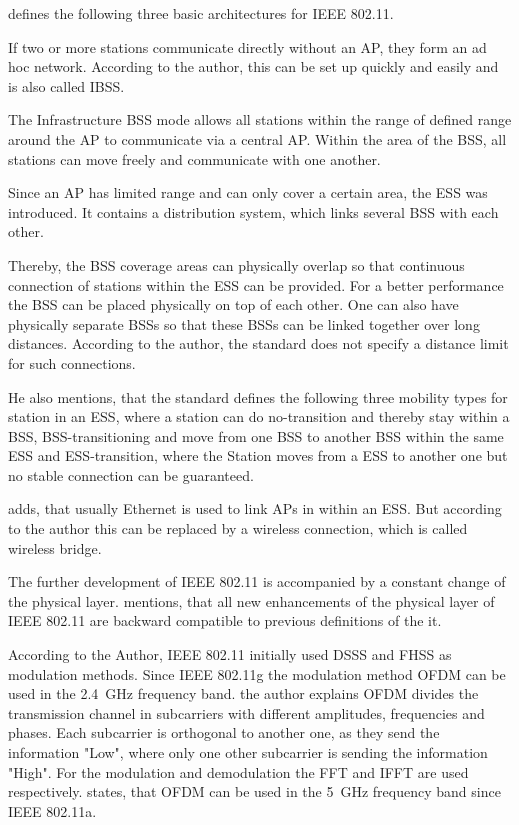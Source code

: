 \documentclass[]{nsm-thesis}
\begin{document}
\textcite{kauffels_wireless_2002} defines the following three basic architectures for IEEE 802.11.

If two or more stations communicate directly without an AP, they form an ad hoc network. According to the author, this can be set up quickly and easily and is also called \ac{IBSS}.

The Infrastructure \ac{BSS} mode allows all stations within the range of defined range around the \ac{AP} to communicate via a central \ac{AP}. Within the area of the \ac{BSS}, all stations can move freely and communicate with one another.

Since an \ac{AP} has limited range and can only cover a certain area, the \ac{ESS} was introduced. It contains a distribution system, which links several \ac{BSS} with each other.

Thereby, the BSS coverage areas can physically overlap so that continuous connection of stations within the ESS can be provided. For a better performance the \ac{BSS} can be placed physically on top of each other. One can also have physically separate \ac{BSS}s so that these \ac{BSS}s can be linked together over long distances. According to the author, the standard does not specify a distance limit for such connections. 

He also mentions, that the standard defines the following three mobility types for station in an \ac{ESS}, where a station can do no-transition and thereby stay within a \ac{BSS}, \ac{BSS}-transitioning and move from one \ac{BSS} to another \ac{BSS} within the same \ac{ESS} and \ac{ESS}-transition, where the Station moves from a \ac{ESS} to another one but no stable connection can be guaranteed.

\textcite{sauter_wireless_2022} adds, that usually Ethernet is used to link \ac{AP}s in within an \ac{ESS}. But according to the author this can be replaced by a wireless connection, which is called wireless bridge.

The further development of IEEE 802.11 is accompanied by a constant change of the physical layer. \textcite{sauter_wireless_2022} mentions, that all new enhancements of the physical layer of IEEE 802.11 are backward compatible to previous definitions of the it.

According to the Author, IEEE 802.11 initially used DSSS and FHSS as modulation methods.
Since IEEE 802.11g the modulation method \ac{OFDM} can be used in the \SI{2.4}{\giga\hertz} frequency band. the author explains \ac{OFDM} divides the transmission channel in subcarriers with different amplitudes, frequencies and phases. Each subcarrier is orthogonal to another one, as they send the information "Low", where only one other subcarrier is sending the information "High".
For the modulation and demodulation the FFT and IFFT are used respectively.
\textcite{kauffels_wireless_2002} states, that \ac{OFDM} can be used in the \SI{5}{\giga\hertz} frequency band since IEEE 802.11a.
\end{document}
